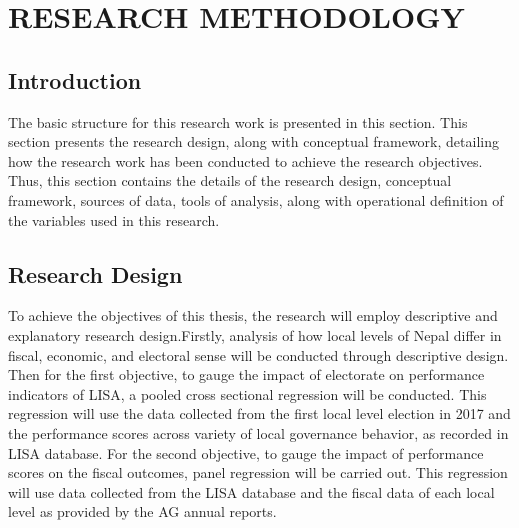 \newpage
\section{RESEARCH METHODOLOGY} 
\subsection{Introduction}
The basic structure for this research work is presented in this section. This section presents the research design, along with conceptual framework, detailing how the research work has been conducted to achieve the research objectives. Thus, this section contains the details of the research design, conceptual framework, sources of data, tools of analysis, along with operational definition of the variables used in this research.  
\vspace{-5mm}
\subsection{Research Design}
To achieve the objectives of this thesis, the research will employ descriptive and explanatory research design.Firstly, analysis of how local levels of Nepal differ in fiscal, economic, and electoral sense will be conducted through descriptive design. Then for the first objective, to gauge the impact of electorate on performance indicators of LISA, a pooled cross sectional regression will be conducted. This regression will use the data collected from the first local level election in 2017 and the performance scores across variety of local governance behavior, as recorded in LISA database. For the second objective, to gauge the impact of performance scores on the fiscal outcomes, panel regression will be carried out. This regression will use data collected from the LISA database and the fiscal data of each local level as provided by the AG annual reports. 
\vspace{-3mm}
